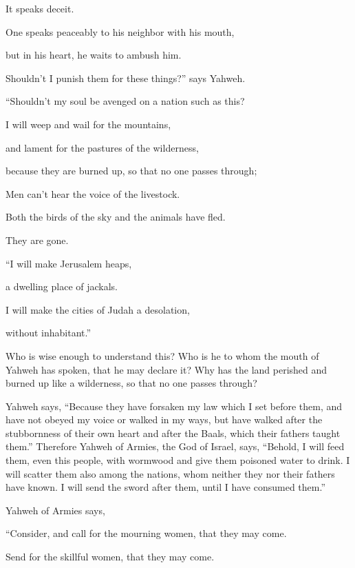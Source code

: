 {\par }{\QB It speaks deceit.
\par }{\Q One speaks peaceably to his neighbor with his mouth,
\par }{\QB but in his heart, he waits to ambush him.
\par }{\Q {}Shouldn’t I punish them for these things?” says Yahweh.
\par }{\QB “Shouldn’t my soul be avenged on a nation such as this?
\par }{\Q {}I will weep and wail for the mountains,
\par }{\QB and lament for the pastures of the wilderness,
\par }{\Q because they are burned up, so that no one passes through;
\par }{\QB Men can’t hear the voice of the livestock.
\par }{\Q Both the birds of the sky and the animals have fled.
\par }{\QB They are gone.
\par }{\BB \par }{\Q {}“I will make Jerusalem heaps,
\par }{\QB a dwelling place of jackals.
\par }{\Q I will make the cities of Judah a desolation,
\par }{\QB without inhabitant.”
\par }{\PP {}Who is wise enough to understand this? Who is he to whom the mouth of Yahweh has spoken, that he may declare it? Why has the land perished and burned up like a wilderness, so that no one passes through?
\par }{\PP {}Yahweh says, “Because they have forsaken my law which I set before them, and have not obeyed my voice or walked in my ways,
but have walked after the stubbornness of their own heart and after the Baals, which their fathers taught them.”
Therefore Yahweh of Armies, the God of Israel, says, “Behold, I will feed them, even this people, with wormwood and give them poisoned water to drink.
I will scatter them also among the nations, whom neither they nor their fathers have known. I will send the sword after them, until I have consumed them.”
\par }{\PP {}Yahweh of Armies says,
\par }{\Q “Consider, and call for the mourning women, that they may come.
\par }{\QB Send for the skillful women, that they may come.
}
